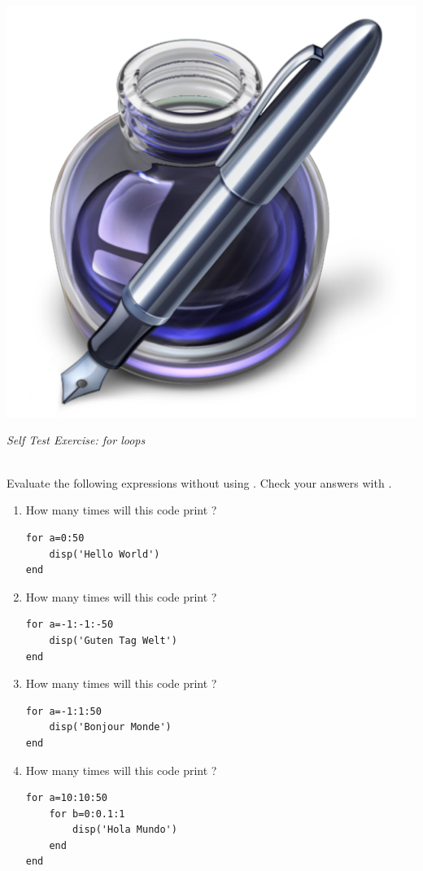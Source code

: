 \addtolength{\parindent}{-4mm}
\begin{minipage}{\linewidth}
\begin{minipage}{6mm}
\includegraphics[scale=0.035]{Graphics/General/exercise_icon}
\end{minipage}
\textit{Self Test Exercise: for loops}
\end{minipage}
\addtolength{\parindent}{4mm}
\\ Evaluate the following expressions without using \mlab. Check your answers with \mlab.
\begin{enumerate}
\item How many times will this code print ?
\begin{lstlisting}
for a=0:50
	disp('Hello World')
end
\end{lstlisting}

\item How many times will this code print ?
\begin{lstlisting}
for a=-1:-1:-50
	disp('Guten Tag Welt')
end
\end{lstlisting}

\item How many times will this code print ?
\begin{lstlisting}
for a=-1:1:50
	disp('Bonjour Monde')
end
\end{lstlisting}

\item How many times will this code print ?
\begin{lstlisting}
for a=10:10:50
	for b=0:0.1:1
		disp('Hola Mundo')
	end
end
\end{lstlisting}
\end{enumerate}

